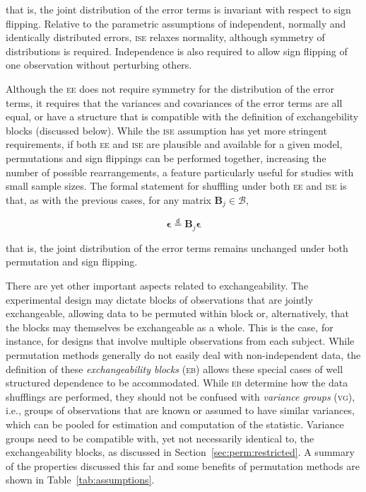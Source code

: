 \noindent
that is, the joint distribution of the error terms is invariant with respect to sign flipping. Relative to the parametric assumptions of independent, normally and identically distributed errors, \textsc{ise} relaxes normality, although symmetry of distributions is required. Independence is also required to allow sign flipping of one observation without perturbing others.

Although the \textsc{ee} does not require symmetry for the distribution of the error terms, it requires that the variances and covariances of the error terms are all equal, or have a structure that is compatible with the definition of exchangebility blocks (discussed below). While the \textsc{ise} assumption has yet more stringent requirements, if both \textsc{ee} and \textsc{ise} are plausible and available for a given model, permutations and sign flippings can be performed together, increasing the number of possible rearrangements, a feature particularly useful for studies with small sample sizes. The formal statement for shuffling under both \textsc{ee} and \textsc{ise} is that, as with the previous cases, for any matrix $\mathbf{B}_{j} \in \mathcal{B}$,

\begin{equation}
\boldsymbol{\epsilon} \stackrel{\mathsf{d}}{=} \mathbf{B}_{j}\boldsymbol{\epsilon}
\end{equation}

\noindent
that is, the joint distribution of the error terms remains unchanged under both permutation and sign flipping.

There are yet other important aspects related to exchangeability. The experimental design may dictate blocks of observations that are jointly exchangeable, allowing data to be permuted within block or, alternatively, that the blocks may themselves be exchangeable as a whole. This is the case, for instance, for designs that involve multiple observations from each subject. While permutation methods generally do not easily deal with non-independent data, the definition of these \emph{exchangeability blocks} (\textsc{eb}) allows these special cases of well structured dependence to be accommodated. While \textsc{eb} determine how the data shufflings are performed, they should not be confused with \emph{variance groups} (\textsc{vg}), i.e., groups of observations that are known or assumed to have similar variances, which can be pooled for estimation and computation of the statistic. Variance groups need to be compatible with, yet not necessarily identical to, the exchangeability blocks, as discussed in Section~\ref{sec:perm:restricted}. A summary of the properties discussed this far and some benefits of permutation methods are shown in Table~\ref{tab:assumptions}.

